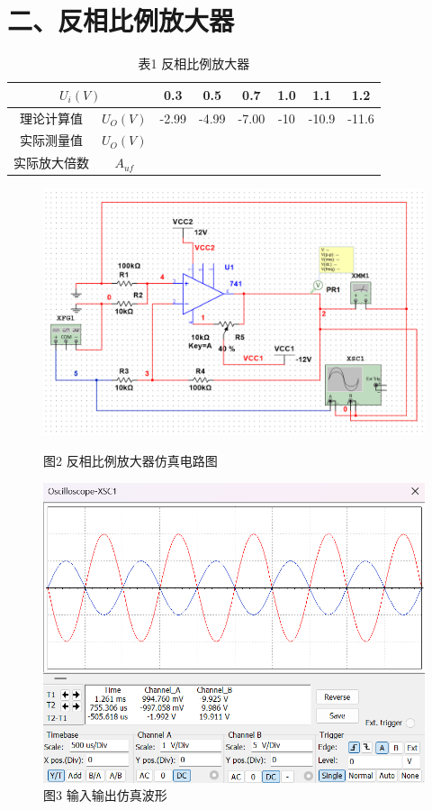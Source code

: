 \documentclass[a4paper,10pt,notitlepage]{article}
\begin{document}
	\section*{二、反相比例放大器}
	\begin{table}[h]
		\centering
		\begin{tabular}{|c|c|c|c|c|c|c|c|}
			\hline
			\multicolumn{2}{|c|}{$U_i(V)$} & 0.3 & 0.5 & 0.7 & 1.0 & 1.1 & 1.2 \\
			\hline
			理论计算值 & $U_O(V)$ & -2.99 & -4.99 & -7.00 & -10 & -10.9 & -11.6 \\
			\hline
			实际测量值 & $U_O(V)$ & \qquad & \qquad & \qquad & \qquad & \qquad & \qquad \\
			\hline
			实际放大倍数 & $A_{uf}$ & \qquad & \qquad & \qquad & \qquad & \qquad & \qquad \\
			\hline
		\end{tabular}
		\caption*{表1 反相比例放大器}
	\end{table}
	\begin{figure}[h]
		\raggedright
		\begin{minipage}{0.4\textwidth}
			\centering
			\includegraphics[width=\textwidth]{5.png}
			\caption*{图2 反相比例放大器仿真电路图}
		\end{minipage}
		\qquad
		\begin{minipage}{0.4\textwidth}
			\centering
			\includegraphics[width=\textwidth]{3.png}
			\caption*{图3 输入输出仿真波形}
		\end{minipage}
	\end{figure}
\end{document}
